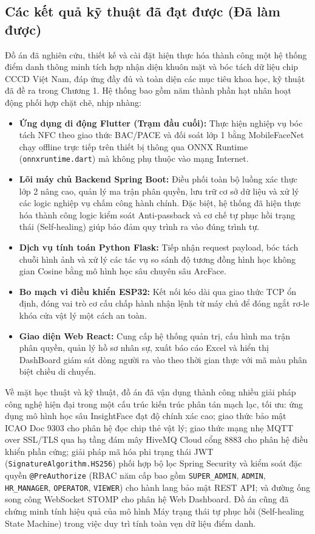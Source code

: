 \documentclass[../DoAn.tex]{subfiles}
\begin{document}
\subsection{Các kết quả kỹ thuật đã đạt được (Đã làm được)}
Đồ án đã nghiên cứu, thiết kế và cài đặt hiện thực hóa thành công một hệ thống điểm danh thông minh tích hợp nhận diện khuôn mặt và bóc tách dữ liệu chip CCCD Việt Nam, đáp ứng đầy đủ và toàn diện các mục tiêu khoa học, kỹ thuật đã đề ra trong Chương 1. Hệ thống bao gồm năm thành phần hạt nhân hoạt động phối hợp chặt chẽ, nhịp nhàng:
\begin{itemize}
    \item \textbf{Ứng dụng di động Flutter (Trạm đầu cuối):} Thực hiện nghiệp vụ bóc tách NFC theo giao thức BAC/PACE và đối soát lớp 1 bằng MobileFaceNet chạy offline trực tiếp trên thiết bị thông qua ONNX Runtime (\texttt{onnxruntime.dart}) mà không phụ thuộc vào mạng Internet.
    \item \textbf{Lõi máy chủ Backend Spring Boot:} Điều phối toàn bộ luồng xác thực lớp 2 nâng cao, quản lý ma trận phân quyền, lưu trữ cơ sở dữ liệu và xử lý các logic nghiệp vụ chấm công hành chính. Đặc biệt, hệ thống đã hiện thực hóa thành công logic kiểm soát Anti-passback và cơ chế tự phục hồi trạng thái (Self-healing) giúp bảo đảm quy trình ra vào đúng trình tự.
    \item \textbf{Dịch vụ tính toán Python Flask:} Tiếp nhận request payload, bóc tách chuỗi hình ảnh và xử lý các tác vụ so sánh độ tương đồng hình học không gian Cosine bằng mô hình học sâu chuyên sâu ArcFace.
    \item \textbf{Bo mạch vi điều khiển ESP32:} Kết nối kéo dài qua giao thức TCP ổn định, đóng vai trò cơ cấu chấp hành nhận lệnh từ máy chủ để đóng ngắt rơ-le khóa cửa vật lý một cách an toàn.
    \item \textbf{Giao diện Web React:} Cung cấp hệ thống quản trị, cấu hình ma trận phân quyền, quản lý hồ sơ nhân sự, xuất báo cáo Excel và hiển thị DashBoard giám sát dòng người ra vào theo thời gian thực với mã màu phân biệt chiều di chuyển.
\end{itemize}

Về mặt học thuật và kỹ thuật, đồ án đã vận dụng thành công nhiều giải pháp công nghệ hiện đại trong một cấu trúc kiến trúc phân tán mạch lạc, tối ưu: ứng dụng mô hình học sâu InsightFace đạt độ chính xác cao; giao thức bảo mật ICAO Doc 9303 \cite{icao9303} cho phân hệ đọc chip thẻ vật lý; giao thức mạng nhẹ MQTT over SSL/TLS qua hạ tầng đám mây HiveMQ Cloud \cite{hivemq} cổng 8883 cho phân hệ điều khiển phần cứng; giải pháp mã hóa phi trạng thái JWT (\texttt{SignatureAlgorithm.HS256}) phối hợp bộ lọc Spring Security và kiểm soát đặc quyền \texttt{@PreAuthorize} (RBAC năm cấp bao gồm \texttt{SUPER\_ADMIN}, \texttt{ADMIN}, \texttt{HR\_MANAGER}, \texttt{OPERATOR}, \texttt{VIEWER}) cho hành lang bảo mật REST API; và đường ống song công WebSocket STOMP \cite{rfc6455} cho phân hệ Web Dashboard. Đồ án cũng đã chứng minh tính hiệu quả của mô hình Máy trạng thái tự phục hồi (Self-healing State Machine) trong việc duy trì tính toàn vẹn dữ liệu điểm danh.
\end{document}
